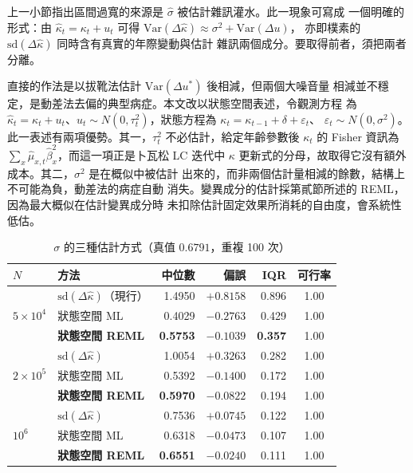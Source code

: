 \documentclass[UTF8, fontset=macnew, a4paper, 12pt]{ctexart}
\begin{document}
上一小節指出區間過寬的來源是 $\hat\sigma$ 被估計雜訊灌水。此一現象可寫成
一個明確的形式：由 $\hat\kappa_t=\kappa_t+u_t$ 可得
$\mathrm{Var}(\Delta\hat\kappa)\approx\sigma^2+\mathrm{Var}(\Delta u)$，
亦即樸素的 $\mathrm{sd}(\Delta\hat\kappa)$ 同時含有真實的年際變動與估計
雜訊兩個成分。要取得前者，須把兩者分離。

直接的作法是以拔靴法估計 $\mathrm{Var}(\Delta u^*)$ 後相減，但兩個大噪音量
相減並不穩定，是動差法去偏的典型病症。本文改以狀態空間表述，令觀測方程
為 $\hat\kappa_t=\kappa_t+u_t$、$u_t\sim N(0,\tau_t^2)$，狀態方程為
$\kappa_t=\kappa_{t-1}+\delta+\varepsilon_t$、
$\varepsilon_t\sim N(0,\sigma^2)$。此一表述有兩項優勢。其一，$\tau_t^2$
不必估計，給定年齡參數後 $\kappa_t$ 的 Fisher 資訊為
$\sum_x\hat\mu_{x,t}\hat\beta_x^2$，而這一項正是卜瓦松 LC 迭代中 $\kappa$
更新式的分母，故取得它沒有額外成本。其二，$\sigma^2$ 是在概似中被估計
出來的，而非兩個估計量相減的餘數，結構上不可能為負，動差法的病症自動
消失。變異成分的估計採第貳節所述的 REML，因為最大概似在估計變異成分時
未扣除估計固定效果所消耗的自由度，會系統性低估。

\begin{table}[H]
\centering
\caption{$\sigma$ 的三種估計方式（真值 $0.6791$，重複 100 次）}
\small
\begin{tabular}{llrrrc}
\toprule
$N$ & 方法 & 中位數 & 偏誤 & IQR & 可行率\\
\midrule
\multirow{3}{*}{$5\times10^4$}
 & $\mathrm{sd}(\Delta\hat\kappa)$（現行） & 1.4950 & $+0.8158$ & 0.896 & 1.00\\
 & 狀態空間 ML                             & 0.4029 & $-0.2763$ & 0.429 & 1.00\\
 & \textbf{狀態空間 REML}                  & \textbf{0.5753} & $\mathbf{-0.1039}$ & \textbf{0.357} & 1.00\\
\midrule
\multirow{3}{*}{$2\times10^5$}
 & $\mathrm{sd}(\Delta\hat\kappa)$ & 1.0054 & $+0.3263$ & 0.282 & 1.00\\
 & 狀態空間 ML                     & 0.5392 & $-0.1400$ & 0.172 & 1.00\\
 & \textbf{狀態空間 REML}          & \textbf{0.5970} & $\mathbf{-0.0822}$ & 0.194 & 1.00\\
\midrule
\multirow{3}{*}{$10^6$}
 & $\mathrm{sd}(\Delta\hat\kappa)$ & 0.7536 & $+0.0745$ & 0.122 & 1.00\\
 & 狀態空間 ML                     & 0.6318 & $-0.0473$ & 0.107 & 1.00\\
 & \textbf{狀態空間 REML}          & \textbf{0.6551} & $\mathbf{-0.0240}$ & 0.111 & 1.00\\
\bottomrule
\end{tabular}
\label{tab:sigma}
\end{table}
\end{document}
